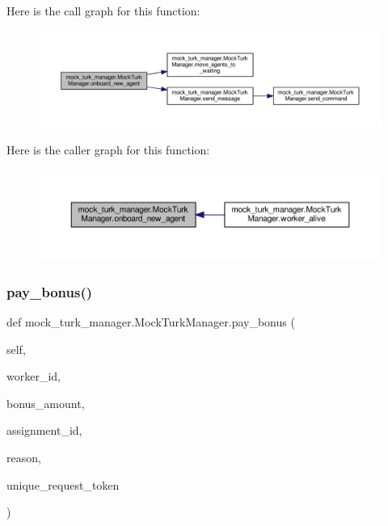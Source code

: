 Here is the call graph for this function\+:
\nopagebreak
\begin{figure}[H]
\begin{center}
\leavevmode
\includegraphics[width=350pt]{classmock__turk__manager_1_1MockTurkManager_aa71ab452422b7871d2fc2ae2b2b8af0d_cgraph}
\end{center}
\end{figure}
Here is the caller graph for this function\+:
\nopagebreak
\begin{figure}[H]
\begin{center}
\leavevmode
\includegraphics[width=350pt]{classmock__turk__manager_1_1MockTurkManager_aa71ab452422b7871d2fc2ae2b2b8af0d_icgraph}
\end{center}
\end{figure}
\mbox{\label{classmock__turk__manager_1_1MockTurkManager_a9e702137ceefe881570593bf45cd091d}} 
\subsubsection{\texorpdfstring{pay\+\_\+bonus()}{pay\_bonus()}}
{\footnotesize\ttfamily def mock\+\_\+turk\+\_\+manager.\+Mock\+Turk\+Manager.\+pay\+\_\+bonus (\begin{DoxyParamCaption}\item[{}]{self,  }\item[{}]{worker\+\_\+id,  }\item[{}]{bonus\+\_\+amount,  }\item[{}]{assignment\+\_\+id,  }\item[{}]{reason,  }\item[{}]{unique\+\_\+request\+\_\+token }\end{DoxyParamCaption})}



